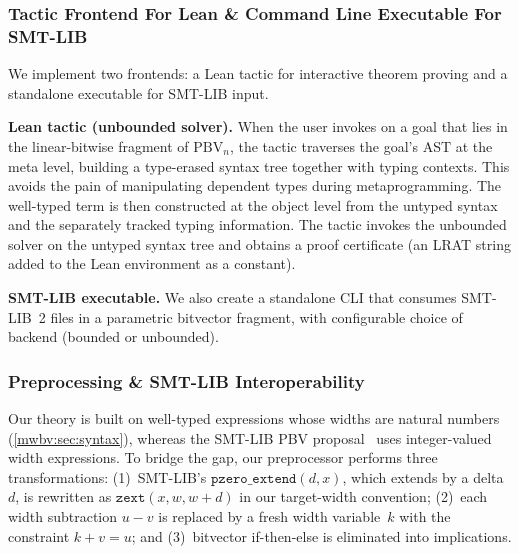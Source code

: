 \subsubsection{Tactic Frontend For Lean \& Command Line Executable For SMT-LIB}

We implement two frontends: a Lean tactic for interactive theorem proving
and a standalone executable for SMT-LIB input.

\noindent\textbf{Lean tactic (unbounded solver).}
When the user invokes \ourtactic{} on a goal that lies in the linear-bitwise
fragment of $\text{PBV}_n$, the tactic traverses the goal's AST at the meta
level, building a type-erased syntax tree together with typing contexts. This
avoids the pain of manipulating dependent types during metaprogramming. The
well-typed term is then constructed at the object level from the untyped syntax
and the separately tracked typing information. The tactic invokes the unbounded
solver on the untyped syntax tree and obtains a proof certificate (an LRAT
string added to the Lean environment as a constant).

\noindent\textbf{SMT-LIB executable.}
We also create a standalone CLI that consumes SMT-LIB~2 files
in a parametric bitvector fragment, with configurable choice of backend (bounded or unbounded).

\subsubsection{Preprocessing \& SMT-LIB Interoperability}

Our theory is built on well-typed expressions whose widths are natural numbers
(\cref{mwbv:sec:syntax}), whereas the SMT-LIB PBV
proposal~\cite{bit-precise-parametric-bv} uses integer-valued width expressions.
To bridge the gap, our preprocessor performs three transformations:
(1)~SMT-LIB's $\texttt{pzero\_extend}(d, x)$, which extends by a delta~$d$,
is rewritten as $\texttt{zext}(x, w, w+d)$ in our target-width convention;
(2)~each width subtraction $u - v$ is replaced by a fresh width variable~$k$
with the constraint $k + v = u$; and
(3)~bitvector if-then-else is eliminated into implications.

